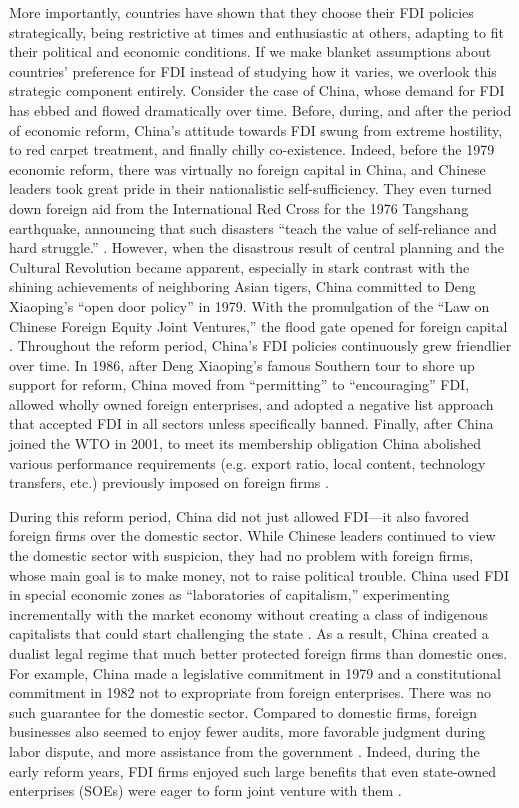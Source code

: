 More importantly, countries have shown that they choose their FDI policies
strategically, being restrictive at times and enthusiastic at others, adapting
to fit their political and economic conditions. If we make blanket assumptions
about countries' preference for FDI instead of studying how it varies, we
overlook this strategic component entirely. Consider the case of China, whose
demand for FDI has ebbed and flowed dramatically over time. Before, during, and
after the period of economic reform, China's attitude towards FDI swung from
extreme hostility, to red carpet treatment, and finally chilly co-existence.
Indeed, before the 1979 economic reform, there was virtually no foreign capital
in China, and Chinese leaders took great pride in their nationalistic
self-sufficiency. They even turned down foreign aid from the International Red
Cross for the 1976 Tangshang earthquake, announcing that such disasters ``teach
the value of self-reliance and hard struggle.'' \citep{Butterfield1976}.
However, when the disastrous result of central planning and the Cultural
Revolution became apparent, especially in stark contrast with the shining
achievements of neighboring Asian tigers, China committed to Deng Xiaoping's
``open door policy'' in 1979. With the promulgation of the ``Law on Chinese
Foreign Equity Joint Ventures,'' the flood gate opened for foreign capital
\citep{Wei1996}. Throughout the reform period, China's FDI policies continuously
grew friendlier over time. In 1986, after Deng Xiaoping's famous Southern tour
to shore up support for reform, China moved from ``permitting'' to
``encouraging'' FDI, allowed wholly owned foreign enterprises, and adopted a
negative list approach that accepted FDI in all sectors unless specifically
banned. Finally, after China joined the WTO in 2001, to meet its membership
obligation China abolished various performance requirements (e.g. export ratio,
local content, technology transfers, etc.) previously imposed on foreign firms
\citep{Long2005}.

During this reform period, China did not just allowed FDI---it also favored
foreign firms over the domestic sector. While Chinese leaders continued to view
the domestic sector with suspicion, they had no problem with foreign firms,
whose main goal is to make money, not to raise political trouble. China used FDI
in special economic zones as ``laboratories of capitalism,'' experimenting
incrementally with the market economy without creating a class of indigenous
capitalists that could start challenging the state \citep{Gallagher2002}. As a
result, China created a dualist legal regime that much better protected foreign
firms than domestic ones. For example, China made a legislative commitment in
1979 and a constitutional commitment in 1982 not to expropriate from foreign
enterprises. There was no such guarantee for the domestic sector. Compared to
domestic firms, foreign businesses also seemed to enjoy fewer audits, more
favorable judgment during labor dispute, and more assistance from the government
\citep{Huang2003, Huang2011}. Indeed, during the early reform years, FDI firms
enjoyed such large benefits that even state-owned enterprises (SOEs) were eager
to form joint venture with them \citep[59]{Gu1997}.

